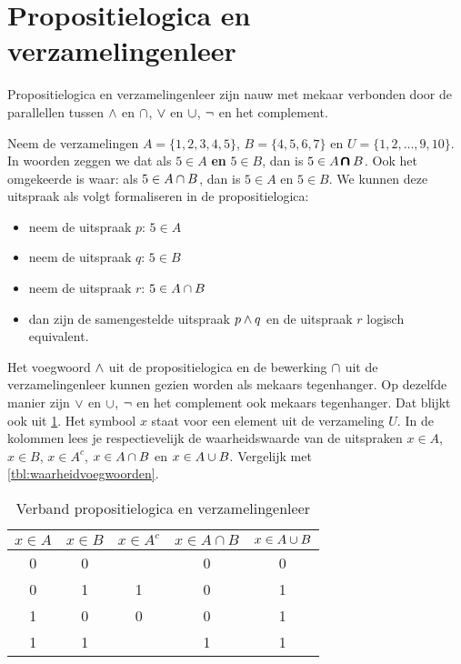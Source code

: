 \section{Propositielogica en verzamelingenleer}
Propositielogica en verzamelingenleer zijn nauw met mekaar verbonden door de parallellen tussen $\wedge$ en $\cap$, $\vee$ en $\cup$, $\neg$ en het complement.

Neem de verzamelingen $A=\{1,2,3,4,5\}$, $B=\{4,5,6,7\}$ en $U=\{1,2,\dots,9,10\}$. 
In woorden zeggen we dat  als $5\in A$ \textbf{en} $5\in B$, dan is $5\in A\pmb{\pmb{\cap}} B$. Ook het omgekeerde is waar: als $5\in A\cap B$, dan is $5\in A$ en $5\in B$. We kunnen deze uitspraak  als volgt formaliseren in de propositielogica:
\begin{itemize}
\item neem de uitspraak $p$: $5\in A$
\item neem de uitspraak $q$: $5\in B$
\item neem de uitspraak $r$: $5\in A \cap B$
\item dan zijn de samengestelde uitspraak $p\wedge q$ en de uitspraak $r$ logisch equivalent.
\end{itemize}
Het voegwoord $\wedge$ uit de propositielogica en de bewerking $\cap$ uit de verzamelingenleer kunnen gezien worden als mekaars tegenhanger. Op dezelfde manier zijn $\vee$ en $\cup$, $\neg$ en het complement ook mekaars tegenhanger. Dat blijkt ook uit \cref{tbl:waarheidstabelVerzamelingen}. Het symbool $x$ staat voor een element uit de verzameling $U$. In de kolommen lees je respectievelijk de waarheidswaarde van de uitspraken $x\in A$, $x\in B$, $x\in A^c$, $x\in A\cap B$ en $x\in A\cup B$. Vergelijk met \cref{tbl:waarheidvoegwoorden}.

\begin{table}[htb]
  \centering
  \caption{Verband propositielogica en verzamelingenleer}\label{tbl:waarheidstabelVerzamelingen}
\begin{tabular}{ccccc}
\toprule
 $x\in A$  & $x\in B$ & $x\in A^c$ & $x\in A\cap B$ & $x\in A\cup B$  \\
\midrule
  0 & 0 & & 0 & 0 \\
  0 & 1 & 1 & 0 & 1 \\
  1 & 0 & 0 & 0 & 1 \\
  1 & 1 &  & 1 & 1 \\
\bottomrule
\end{tabular}
\end{table}

